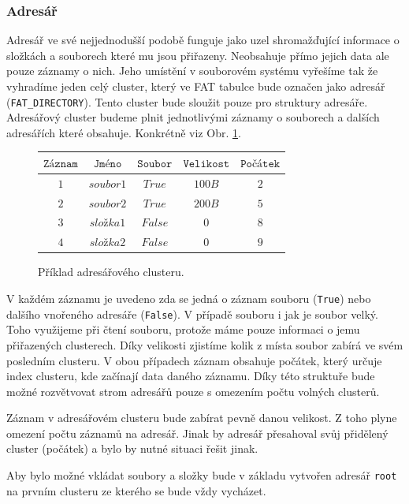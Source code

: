 \documentclass[12pt]{article}
\begin{document}
\subsubsection{Adresář} \label{adresar}
Adresář ve své nejjednodušší podobě funguje jako uzel shromažďující informace o složkách a souborech které mu jsou přiřazeny. Neobsahuje přímo jejich data ale pouze záznamy o nich. Jeho umístění v souborovém systému vyřešíme tak že vyhradíme jeden celý cluster, který ve FAT tabulce bude označen jako adresář (\texttt{FAT\_DIRECTORY}). Tento cluster bude sloužit pouze pro struktury adresáře. Adresářový cluster budeme plnit jednotlivými záznamy o souborech a dalších adresářích které obsahuje. Konkrétně viz Obr. \ref{obr3}.

\begin{figure}[H]
\centering
\begin{tabular}{|c|c|c|c|c|}
$\texttt{Záznam}$ & $\texttt{Jméno}$ & $\texttt{Soubor}$ & $\texttt{Velikost}$ & $\texttt{Počátek}$\\\hline
$1$ & $soubor1$ & $True$	& $100B$ & $2$\\\hline
$2$ & $soubor2$ & $True$	& $200B$ & $5$\\\hline
$3$ & $složka1$ & $False$	& $0$	 & $8$\\\hline
$4$ & $složka2$ & $False$	& $0$	 & $9$\\\hline
\end{tabular}
\caption{Příklad adresářového clusteru.}
\label{obr3}
\end{figure}

V každém záznamu je uvedeno zda se jedná o záznam souboru (\texttt{True}) nebo dalšího vnořeného adresáře (\texttt{False}). V případě souboru i jak je soubor velký. Toho využijeme při čtení souboru, protože máme pouze informaci o jemu přiřazených clusterech. Díky velikosti zjistíme kolik z místa soubor zabírá ve svém posledním clusteru. V obou případech záznam obsahuje počátek, který určuje index clusteru, kde začínají data daného záznamu. Díky této struktuře bude možné rozvětvovat strom adresářů pouze s omezením počtu volných clusterů.

Záznam v adresářovém clusteru bude zabírat pevně danou velikost. Z toho plyne omezení počtu záznamů na adresář. Jinak by adresář přesahoval svůj přidělený cluster (počátek) a bylo by nutné situaci řešit jinak.

Aby bylo možné vkládat soubory a složky bude v základu vytvořen adresář \texttt{root} na prvním clusteru ze kterého se bude vždy vycházet.
\end{document}
